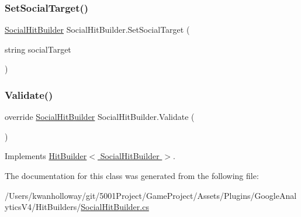 \mbox{\label{class_social_hit_builder_a31ee440ecd51d3dc415faa5f1c59045a}} 
\subsubsection{\texorpdfstring{Set\+Social\+Target()}{SetSocialTarget()}}
{\footnotesize\ttfamily \hyperlink{class_social_hit_builder}{Social\+Hit\+Builder} Social\+Hit\+Builder.\+Set\+Social\+Target (\begin{DoxyParamCaption}\item[{string}]{social\+Target }\end{DoxyParamCaption})}

\mbox{\label{class_social_hit_builder_a55388edd43f10cc41918833aa2526a8e}} 
\subsubsection{\texorpdfstring{Validate()}{Validate()}}
{\footnotesize\ttfamily override \hyperlink{class_social_hit_builder}{Social\+Hit\+Builder} Social\+Hit\+Builder.\+Validate (\begin{DoxyParamCaption}{ }\end{DoxyParamCaption})\hspace{0.3cm}{\ttfamily [virtual]}}



Implements \hyperlink{class_hit_builder_a0f4833828bd530bb057c9ca359584bce}{Hit\+Builder$<$ Social\+Hit\+Builder $>$}.



The documentation for this class was generated from the following file\+:\begin{DoxyCompactItemize}
\item 
/\+Users/kwanholloway/git/5001\+Project/\+Game\+Project/\+Assets/\+Plugins/\+Google\+Analytics\+V4/\+Hit\+Builders/\hyperlink{_social_hit_builder_8cs}{Social\+Hit\+Builder.\+cs}\end{DoxyCompactItemize}
